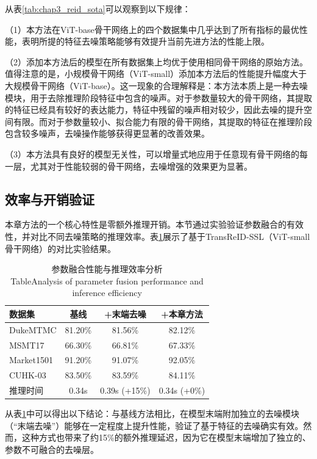 从表\ref{tab:chap3_reid_sota}可以观察到以下规律：

（1）本方法在ViT-base骨干网络上的四个数据集中几乎达到了所有指标的最优性能，表明所提的特征去噪策略能够有效提升当前先进方法的性能上限。

（2）添加本方法后的模型在所有数据集上均优于使用相同骨干网络的原始方法。值得注意的是，小规模骨干网络（ViT-small）添加本方法后的性能提升幅度大于大规模骨干网络（ViT-base）。这一现象的合理解释是：本方法本质上是一种去噪模块，用于去除推理阶段特征中包含的噪声。对于参数量较大的骨干网络，其提取的特征已经具有较好的表达能力，特征中残留的噪声相对较少，因此去噪的提升空间有限。而对于参数量较小、拟合能力有限的骨干网络，其提取的特征在推理阶段包含较多噪声，去噪操作能够获得更显著的改善效果。

（3）本方法具有良好的模型无关性，可以增量式地应用于任意现有骨干网络的每一层，尤其对于性能较弱的骨干网络，去噪增强的效果更为显著。

\subsection{效率与开销验证}

本章方法的一个核心特性是零额外推理开销。本节通过实验验证参数融合的有效性，并对比不同去噪策略的推理效率。表\ref{tab:chap3_efficiency}展示了基于TransReID-SSL（ViT-small骨干网络）的对比实验结果。

\begin{table}[htbp]
\centering
\caption{参数融合性能与推理效率分析\protect\\[-2pt]{\rm Table\;\thetable\quad Analysis of parameter fusion performance and inference efficiency}}\label{tab:chap3_efficiency}
\vspace{0.2cm}
\renewcommand{\arraystretch}{1.15}
\begin{tabular}{l|c|c|c}
\hline \hline
数据集 & 基线 & +末端去噪 & +本章方法 \\
\hline
DukeMTMC & 81.20\% & 81.56\% & 82.12\% \\
MSMT17 & 66.30\% & 66.81\% & 67.33\% \\
Market1501 & 91.20\% & 91.07\% & 92.05\% \\
CUHK-03 & 83.50\% & 83.59\% & 84.11\% \\
\hline
推理时间 & 0.34s & 0.39s (+15\%) & 0.34s (+0\%) \\
\hline \hline
\end{tabular}
\end{table}

从表\ref{tab:chap3_efficiency}中可以得出以下结论：与基线方法相比，在模型末端附加独立的去噪模块（``末端去噪''）能够在一定程度上提升性能，验证了基于特征的去噪确实有效。然而，这种方式也带来了约15\%的额外推理延迟，因为它在模型末端增加了独立的、参数不可融合的去噪层。

